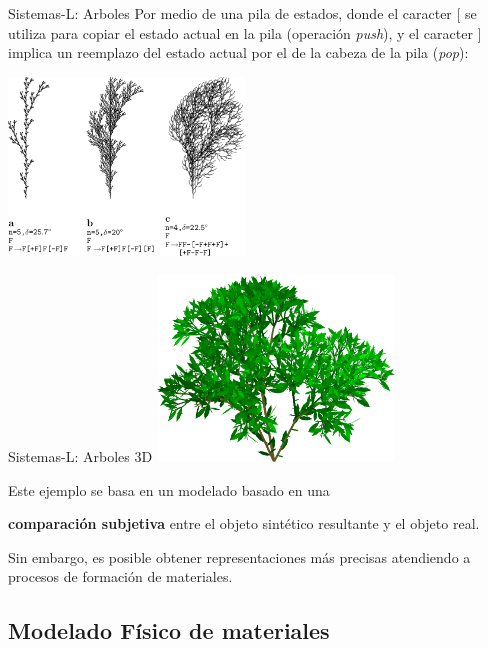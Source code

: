 \documentclass[spanish]{beamer}
\begin{document}
\begin{frame}{Sistemas-L: Arboles}
Por medio de una pila de estados, donde el caracter $[$ se utiliza para copiar el estado actual en la pila (operación {\em push}), y el caracter $]$ implica un reemplazo del estado actual por el de la cabeza de la pila ({\em pop}):


\center
\includegraphics[width=6.3cm]{../figures/sistemalcorchete}

\end{frame}

\begin{frame}{Sistemas-L: Arboles 3D}
\center
\includegraphics[width=6.3cm]{../figures/3dlsystem}

\end{frame}

\begin{frame}
Este ejemplo se basa en un modelado basado en una 

\textbf{comparación subjetiva} entre el objeto sintético resultante y el objeto real.

\vspace{1cm}

Sin embargo, es posible obtener representaciones más precisas atendiendo a procesos de formación de materiales.
\end{frame}

\subsection{Modelado Físico de materiales}
\end{document}
